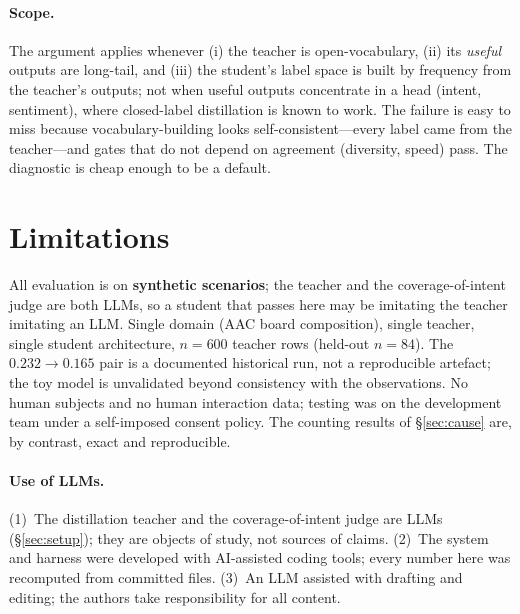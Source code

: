 \paragraph{Scope.} The argument applies whenever (i) the teacher is
open-vocabulary, (ii) its \emph{useful} outputs are long-tail, and (iii) the
student's label space is built by frequency from the teacher's outputs; not
when useful outputs concentrate in a head (intent, sentiment), where
closed-label distillation is known to work. The failure is easy to miss
because vocabulary-building looks self-consistent---every label came from the
teacher---and gates that do not depend on agreement (diversity, speed) pass.
The diagnostic is cheap enough to be a default.

\section{Limitations}
All evaluation is on \textbf{synthetic scenarios}; the teacher and the
coverage-of-intent judge are both LLMs, so a student that passes here may be
imitating the teacher imitating an LLM. Single domain (AAC board composition),
single teacher, single student architecture, $n=600$ teacher rows (held-out
$n=84$). The $0.232\to0.165$ pair is a documented historical run, not a
reproducible artefact; the toy model is unvalidated beyond consistency with
the observations. No human subjects and no human interaction data; testing was
on the development team under a self-imposed consent policy. The counting
results of \S\ref{sec:cause} are, by contrast, exact and reproducible.

\paragraph{Use of LLMs.} (1)~The distillation teacher and the
coverage-of-intent judge are LLMs (\S\ref{sec:setup}); they are objects of
study, not sources of claims. (2)~The system and harness were developed
with AI-assisted coding tools; every number here was recomputed from committed
files. (3)~An LLM assisted with drafting
and editing; the authors take responsibility for all content.

